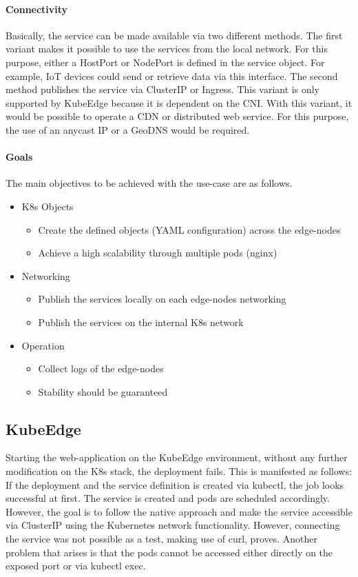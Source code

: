 \documentclass[MIC,Master,english]{twbook}%
\begin{document}
\paragraph{Connectivity} Basically, the service can be made available via two different methods. The first variant makes it possible to use the services from the local network. For this purpose, either a HostPort or NodePort is defined in the service object. For example, IoT devices could send or retrieve data via this interface. The second method publishes the service via ClusterIP or Ingress. This variant is only supported by KubeEdge because it is dependent on the \ac{CNI}. With this variant, it would be possible to operate a CDN or distributed web service. For this purpose, the use of an anycast IP or a GeoDNS would be required.

\paragraph{Goals} The main objectives to be achieved with the use-case are as follows.
\begin{itemize}
    \item \ac{K8s} Objects
    \begin{itemize}
        \item Create the defined objects (YAML configuration) across the edge-nodes
        \item Achieve a high scalability through multiple pods (nginx)
    \end{itemize}
    \item Networking
    \begin{itemize}
        \item Publish the services locally on each edge-nodes networking
        \item Publish the services on the internal \ac{K8s} network
    \end{itemize}
    \item Operation
    \begin{itemize}
        \item Collect logs of the edge-nodes
        \item Stability should be guaranteed
    \end{itemize}
\end{itemize}

\subsection{KubeEdge} 
\label{sec:ke-usecase}
Starting the web-application on the KubeEdge environment, without any further modification on the \ac{K8s} stack, the deployment fails. This is manifested as follows: If the deployment and the service definition is created via kubectl, the job looks successful at first. The service is created and pods are scheduled accordingly. However, the goal is to follow the native approach and make the service accessible via ClusterIP using the Kubernetes network functionality. However, connecting the service was not possible as a test, making use of curl, proves. Another problem that arises is that the pods cannot be accessed either directly on the exposed port or via kubectl exec.
\end{document}
